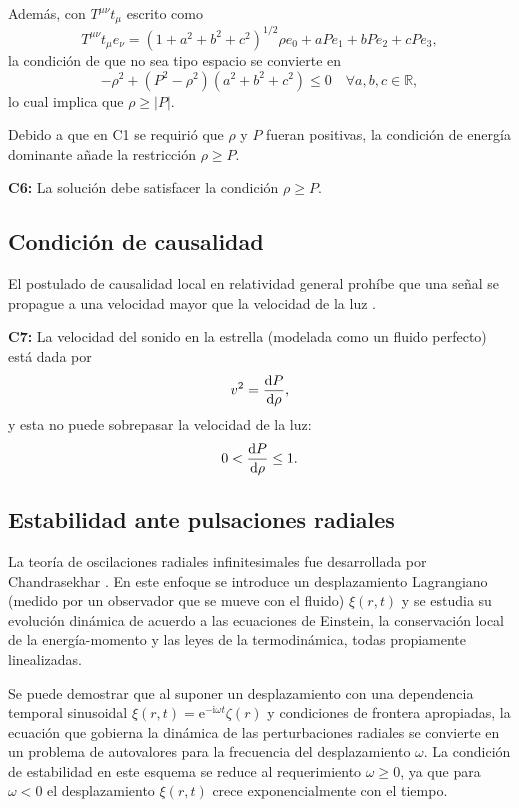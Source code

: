 Además, con $T^{\mu \nu} t_{\mu}$ escrito como
\begin{equation}
T^{\mu \nu} t_{\mu}e_{\nu}=\left(1+a^{2}+b^{2}+c^{2}\right)^{1 / 2} \rho e_{0}+a P e_{1}+b P e_{2}+c P e_{3},
\end{equation}
la condición de que no sea tipo espacio se convierte en
\begin{equation}
    -\rho^2 + (P^2-\rho^2)(a^2+b^2+c^2) \leq 0 \quad \forall a,b,c \in \mathbb{R},
\end{equation}
lo cual implica que $\rho \geq |P|$.

Debido a que en C1 se requirió que $\rho$ y $P$ fueran positivas, la condición de energía dominante añade la restricción $\rho \geq P$.

\textbf{C6:} La solución debe satisfacer la condición $\rho \geq P$.

\subsection*{Condición de causalidad}
\noindent El postulado de causalidad local en relatividad general prohíbe que una señal se propague a una velocidad mayor que la velocidad de la luz \cite{Hawking1973}. 

\textbf{C7:}  La velocidad del sonido en la estrella (modelada como un fluido perfecto) está dada por 
\begin{equation}
    v^2=\dv{P}{\rho},
\end{equation}
y esta no puede sobrepasar la velocidad de la luz:
\begin{equation}
    0 < \dv{P}{\rho} \leq 1 .
\end{equation}

\subsection*{Estabilidad ante pulsaciones radiales}

\noindent La teoría de oscilaciones radiales infinitesimales fue desarrollada por Chandrasekhar \cite{Chandrasekhar1964a}. En este enfoque se introduce un desplazamiento Lagrangiano (medido por un observador que se mueve con el fluido) $\xi(r,t)$ y se estudia su evolución dinámica de acuerdo a las ecuaciones de Einstein, la conservación local de la energía-momento y las leyes de la termodinámica, todas propiamente linealizadas.

Se puede demostrar \cite{Chandrasekhar1964a,Misner1973} que al suponer un desplazamiento con una dependencia temporal sinusoidal $\xi(r, t)=\mathrm{e}^{-\mathrm{i} \omega t} \zeta(r)$  y condiciones de frontera apropiadas, la ecuación que gobierna la dinámica de las perturbaciones radiales se convierte en un problema de autovalores para la frecuencia del desplazamiento $\omega$. La condición de estabilidad en este esquema se reduce al requerimiento $\omega \geq 0$, ya que para $\omega<0$ el desplazamiento $\xi(r,t)$ crece exponencialmente con el tiempo.   


